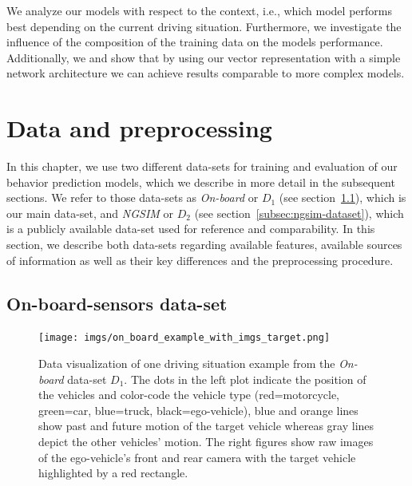 We analyze our models with respect to the context, i.e., which model performs best depending on the current driving situation.
Furthermore, we investigate the influence of the composition of the training data on the models performance.
Additionally, we 
and show that by using our vector representation with a simple network architecture we can achieve results comparable to more complex models.

\section{Data and preprocessing}
\label{sec:data_preproc}

In this chapter, we use two different data-sets for training and evaluation of our behavior prediction models, which we describe in more detail in the subsequent sections.
We refer to those data-sets as \emph{On-board} or $D_1$ (see section~\ref{subsec:onboard-dataset}), which is our main data-set, and \emph{\acs{NGSIM}} or $D_2$ (see section~\ref{subsec:ngsim-dataset}), which is a publicly available data-set used for reference and comparability.
In this section, we describe both data-sets regarding available features, available sources of information as well as their key differences and the preprocessing procedure.

\subsection{On-board-sensors data-set}
\label{subsec:onboard-dataset}

\begin{figure}[t!]
	\centering
	\texttt{[image: imgs/on\_board\_example\_with\_imgs\_target.png]}
    \caption{Data visualization of one driving situation example from the \emph{On-board} data-set $D_1$.
        The dots in the left plot indicate the position of the vehicles and color-code the vehicle type (red=motorcycle, green=car, blue=truck, black=ego-vehicle), blue and orange lines show past and future motion of the target vehicle whereas gray lines depict the other vehicles' motion.
        The right figures show raw images of the ego-vehicle's front and rear camera with the target vehicle
    highlighted by a red rectangle.}\label{fig:on_board_data_example}
\end{figure}

